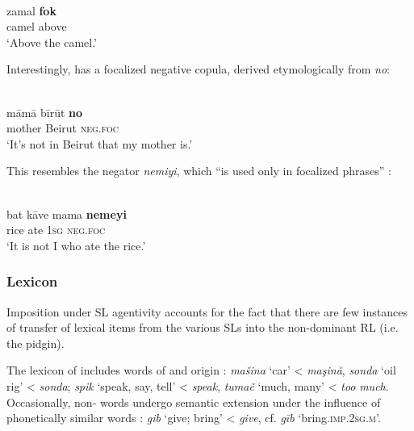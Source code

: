 \documentclass[output=paper]{langsci/langscibook}
\begin{document}
\ex
{} \citep[25]{Avram2014Pidgin}\\
\gll     zamal \textbf{fok} \\
         camel above\\
\glt       `Above the camel.'
\z
\z

Interestingly,  has a focalized negative {copula}, derived etymologically from  \textit{no}:

\ea
{  \citep[133]{Bizri2010}}\\
\gll   māmā bīrūt \textbf{no}\\
       mother Beirut \textsc{neg}.\textsc{foc}\\
\glt     `It’s not in Beirut that my mother is.'
\z

This resembles the  negator \textit{nemiyi}, which “is used only in focalized phrases” \citep[69]{Bizri2010}:

\ea
{  \citep[69]{Bizri2010}}\\
\gll   bat kāve mama \textbf{nemeyi}\\
       rice ate 1\textsc{sg} \textsc{neg}.\textsc{foc}\\
\glt     `It is not I who ate the rice.'
\z

 \subsubsection{Lexicon}

Imposition under {SL} agentivity accounts for the fact that there are few instances of {transfer} of lexical items from the various SLs into the non-dominant {RL} (i.e. the {pidgin}). 

The lexicon of   includes words of  and  origin \citep[32]{Avram2010}: \textit{mašina} ‘car’ <  \textit{maşină}, \textit{sonda} ‘oil rig’ <  \textit{sonda}; \textit{spik} ‘speak, say, tell’ <  \textit{speak}, \textit{tumač} ‘much, many’ <  \textit{too} \textit{much}. Occasionally, non- words undergo semantic {extension} under the influence of phonetically similar  words \citep[32]{Avram2010}: \textit{gib} ‘give; bring’ <  \textit{give}, cf.  \textit{gīb} ‘bring.\textsc{imp.2sg.m}’. 
\end{document}

